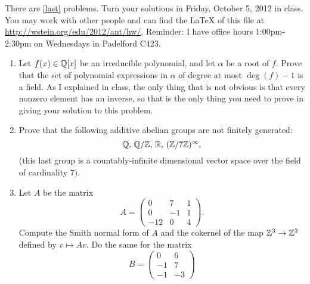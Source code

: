 \documentclass{article}
\title{\dred{Math 581e, Fall 2012, Homework 1}}
\author{William Stein ({\tt wstein@uw.edu})}
\date{Due: Friday, October 5, 2012}
\begin{document}
\maketitle

{\color{dbluecolor}There are \ref{last} problems. Turn your solutions in Friday, October
5, 2012 in class.  You may work with other people and can find the
\LaTeX{} of this file at \url{http://wstein.org/edu/2012/ant/hw/}.
Reminder: I have office hours 1:00pm-2:30pm on Wednesdays in Padelford
C423.}

\begin{enumerate}

\item Let $f(x) \in \mathbb{Q}[x]$ be an irreducible polynomial, and let $\alpha$ be a root of $f$.
Prove that the set of polynomial expressions in $\alpha$ of degree at most $\deg(f)-1$ 
is a field.  As I explained in class, the only thing that is not obvious is that
every nonzero element has an inverse, so that is the only thing you need to prove 
in giving your solution to this problem.   

\item Prove that the following additive abelian groups are not finitely generated:
$$\mathbb{Q},\, \mathbb{Q}/\mathbb{Z},\, \mathbb{R},\, (\mathbb{Z}/7\mathbb{Z})^{\infty},$$ (this last group is a
  countably-infinite dimensional vector space over the field of
  cardinality $7$).  

\item\label{last} Let $A$ be the matrix 
$$A=\left(\begin{array}{rrr}
0 & 7 & 1 \\
0 & -1 & 1 \\
-12 & 0 & 4
\end{array}\right).$$
Compute the Smith normal form of $A$ and the cokernel of the map $\mathbb{Z}^3\to \mathbb{Z}^3$ defined by
$v\mapsto Av$.  Do the same for the matrix 
$$B=\left(\begin{array}{rr}
0 & 6 \\
-1 & 7 \\
-1 & -3
\end{array}\right)$$


\end{enumerate}
\end{document}
